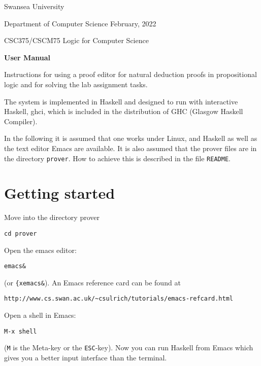 \documentclass[12pt]{article}
\begin{document}
\thispagestyle{empty}

Swansea University 

Department of Computer Science \hfill  February, 2022    %

\begin{center}
\Large CSC375/CSCM75 Logic for Computer Science
\end{center}

\begin{center}
{\Large\bf User Manual}
\end{center} 


\bigskip


Instructions for using a proof editor for natural deduction
proofs in propositional logic and for solving the lab assignment tasks.

The system is implemented in Haskell and designed to run
with interactive Haskell, ghci, which is included in
the distribution of GHC (Glasgow Haskell Compiler).

In the following it is assumed that one works under Linux, 
and Haskell as well as the text editor Emacs are available. 
It is also assumed that the prover files are in the directory \texttt{prover}.
How to achieve this is described in the file \texttt{README}.


\tableofcontents


\section{Getting started}
\label{sec-start}

Move into the directory prover
\begin{verbatim}
cd prover
\end{verbatim}

Open the emacs editor:
\begin{verbatim}
emacs&  
\end{verbatim}
(or \verb|{xemacs&|). An Emacs reference card can be found at
\begin{verbatim}
http://www.cs.swan.ac.uk/~csulrich/tutorials/emacs-refcard.html
\end{verbatim}
Open a shell in Emacs:
\begin{verbatim}
M-x shell  
\end{verbatim}
(\texttt{M} is the Meta-key or the \texttt{ESC}-key).
Now you can run Haskell from Emacs which gives
you a better input interface than the terminal.
\end{document}
